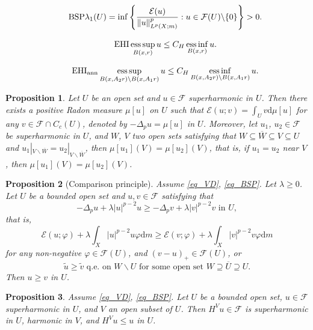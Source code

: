 \documentclass[10pt,a4paper]{amsart}
\newtheorem{proposition}{Proposition}
\newcommand{\einf}{\operatorname*{ess\,inf}}
\newcommand{\esup}{\operatorname*{ess\,sup}}
\begin{document}
\begin{equation*}\label{eq_BSP}\tag*{\text{BSP}}
\lambda_1(U)=\inf \left\{\frac{\mathcal{E}(u)}{\lVert u\rVert_{L^p(X;m)}^p}:u\in \mathcal{F}(U)\backslash \{0\}\right\}>0.
\end{equation*}

\begin{equation*}\label{eq_EHI}\tag*{\text{EHI}}
\esup_{B(x,r)}u\le C_H\einf_{B(x,r)}u.
\end{equation*}

\begin{equation*}\label{eq_EHIann}\tag*{$\text{EHI}_{\text{ann}}$}
\esup_{B(x,A_2r)\backslash B(x,A_1r)}u\le C_H\einf_{B(x,A_2r)\backslash B(x,A_1r)}u.
\end{equation*}

\begin{proposition}\label{prop_super_meas}
Let $U$ be an open set and $u\in\mathcal{F}$ superharmonic in $U$. Then there exists a positive Radon measure $\mu[u]$ on $U$ such that $\mathcal{E}(u;v)=\int_Uv\mathrm{d}\mu[u]$ for any $v\in\mathcal{F}\cap C_c(U)$, denoted by $-\Delta_pu=\mu[u]$ in $U$. Moreover, let $u_1$, $u_2\in\mathcal{F}$ be superharmonic in $U$, and $W$, $V$ two open sets satisfying that $W\subseteq \overline{W}\subseteq V\subseteq U$ and $u_1|_{V\backslash\overline{W}}=u_2|_{V\backslash\overline{W}}$, then $\mu[u_1](V)=\mu[u_2](V)$, that is, if $u_1=u_2$ near $V$, then $\mu[u_1](V)=\mu[u_2](V)$.
\end{proposition}

\begin{proposition}[Comparison principle]\label{prop_comparison}
Assume \ref{eq_VD}, \ref{eq_BSP}. Let $\lambda\ge0$. Let $U$ be a bounded open set and $u,v\in\mathcal{F}$ satisfying that
$$-\Delta_pu+\lambda|u|^{p-2}u\ge-\Delta_pv+\lambda|v|^{p-2}v\text{ in }U,$$
that is,
$$\mathcal{E}(u;\varphi)+\lambda\int_X|u|^{p-2}u\varphi\mathrm{d} m\ge\mathcal{E}(v;\varphi)+\lambda\int_X|v|^{p-2}v\varphi\mathrm{d} m$$
for any non-negative $\varphi\in\mathcal{F}(U)$, and $(v-u)_+\in \mathcal{F}(U)$, or
$$\widetilde{u}\ge \widetilde{v}\text{ q.e. on }W\backslash U\text{ for some open set }W\supseteq \overline{U}\supseteq U.$$
Then $u\ge v$ in $U$.
\end{proposition}

\begin{proposition}\label{prop_Pois_modi}
Assume \ref{eq_VD}, \ref{eq_BSP}. Let $U$ be a bounded open set, $u\in\mathcal{F}$ superharmonic in $U$, and $V$ an open subset of $U$. Then $H^{V}u\in\mathcal{F}$ is superharmonic in $U$, harmonic in $V$, and $H^{V}u\le u$ in $U$.
\end{proposition}
\end{document}
